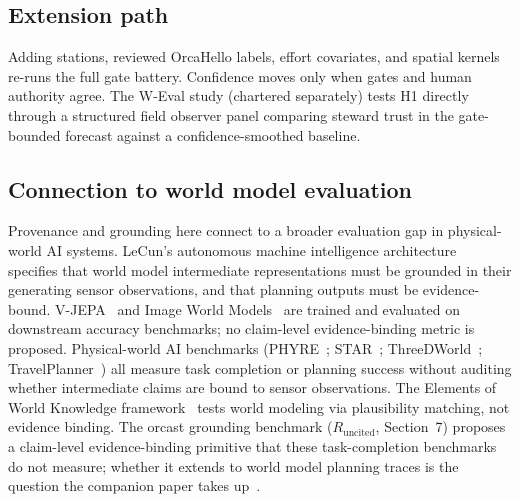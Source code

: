 \subsection{Extension path}

Adding stations, reviewed OrcaHello labels, effort covariates, and spatial kernels re-runs the full gate battery. Confidence moves only when gates and human authority agree. The W-Eval study (chartered separately) tests H1 directly through a structured field observer panel comparing steward trust in the gate-bounded forecast against a confidence-smoothed baseline.

\subsection{Connection to world model evaluation}

Provenance and grounding here connect to a broader evaluation gap in physical-world AI systems. LeCun's autonomous machine intelligence architecture~\cite{arxiv230602572} specifies that world model intermediate representations must be grounded in their generating sensor observations, and that planning outputs must be evidence-bound. V-JEPA~\cite{arxiv240408471} and Image World Models~\cite{arxiv240300504} are trained and evaluated on downstream accuracy benchmarks; no claim-level evidence-binding metric is proposed. Physical-world AI benchmarks (PHYRE~\cite{arxiv190805656}; STAR~\cite{arxiv240509711}; ThreeDWorld~\cite{arxiv210314025}; TravelPlanner~\cite{arxiv240201622}) all measure task completion or planning success without auditing whether intermediate claims are bound to sensor observations. The Elements of World Knowledge framework~\cite{arxiv240509605} tests world modeling via plausibility matching, not evidence binding. The orcast grounding benchmark ($R_\mathrm{uncited}$, Section~7) proposes a claim-level evidence-binding primitive that these task-completion benchmarks do not measure; whether it extends to world model planning traces is the question the companion paper takes up~\cite{arxiv240611460}.

